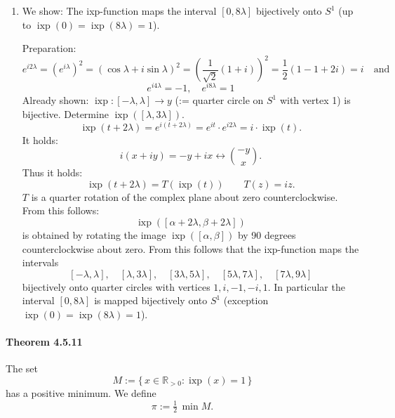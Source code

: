 \documentclass[12pt]{article}
\begin{document}
\begin{enumerate}[label=({\arabic*})]
		From ($**$) we get
		\[
			\sin\!\Bigl(\tfrac{1}{\sqrt{2}}\Bigr) < \tfrac{1}{\sqrt{2}},
			\qquad
			\sin\!\Bigl(\tfrac{4}{5}\Bigr) > \tfrac{4}{5}\Bigl(1 - \tfrac{16}{6\cdot 25}\Bigr)
				> \tfrac{4}{5}\Bigl(1 - \tfrac{16}{144}\Bigr) = \tfrac{32}{45}
				= \frac{\sqrt{1024}}{\sqrt{2025}} > \sqrt{\tfrac{1}{2}}.
		\]
		By monotonicity and continuity of $\sin$ on $I$ there exists a unique $\lambda\in(1/\sqrt{2},\,4/5)$ with $\sin \lambda = 1/\sqrt{2}$. Thus $\operatorname{ixp}([ -\lambda,\lambda])$ is precisely the quarter-arc of $S^{1}$ centered at $1$.
		From ($**$) we also get
		\[
			\cos\lambda = +\sqrt{1-\sin^{2}\!\lambda} = \sqrt{\tfrac{1}{2}},
		\]
		hence
		\[
			e^{\pm i\lambda} = \cos\lambda \pm i\sin\lambda = \tfrac{1}{\sqrt{2}}(1 \pm i).
		\]
		\item We show: The ixp-function maps the interval $[0, 8\lambda]$ bijectively onto $S^1$ (up to $\operatorname{ixp}(0) = \operatorname{ixp}(8\lambda) = 1$).

		Preparation:
		\[
			e^{i2\lambda} = (e^{i\lambda})^2 = (\cos \lambda + i \sin \lambda)^2 = \left(\frac{1}{\sqrt{2}}(1+i)\right)^2 = \frac{1}{2}(1 - 1 + 2i) = i \quad \text{and}
		\]
		\[
			e^{i4\lambda} = -1, \quad e^{i8\lambda} = 1
		\]
		Already shown: $\operatorname{ixp} : [-\lambda, \lambda] \to y$ (:= quarter circle on $S^1$ with vertex 1) is bijective.
		Determine $\operatorname{ixp}([\lambda, 3\lambda])$.
		\[
			\operatorname{ixp}(t + 2\lambda) = e^{i(t+2\lambda)} = e^{it} \cdot e^{i2\lambda} = i \cdot \operatorname{ixp}(t).
		\]
		It holds:
		\[
			i(x + iy) = -y + ix \leftrightarrow \binom{-y}{x}.
		\]
		Thus it holds:
		\[
			\operatorname{ixp}(t + 2\lambda) = T(\operatorname{ixp}(t)) \qquad T(z) = iz.
		\]
		$T$ is a quarter rotation of the complex plane about zero counterclockwise. From this follows:
		\[
			\operatorname{ixp}([\alpha + 2\lambda, \beta + 2\lambda])
		\]
		is obtained by rotating the image $\operatorname{ixp}([\alpha, \beta])$ by 90 degrees counterclockwise about zero. From this follows that the ixp-function maps the intervals
		\[
			[-\lambda, \lambda], \quad [\lambda, 3\lambda], \quad [3\lambda, 5\lambda], \quad [5\lambda, 7\lambda], \quad [7\lambda, 9\lambda]
		\]
		bijectively onto quarter circles with vertices $1, i, -1, -i, 1$. In particular the interval $[0, 8\lambda]$ is mapped bijectively onto $S^1$ (exception $\operatorname{ixp}(0) = \operatorname{ixp}(8\lambda) = 1$).
	\end{enumerate}

	\paragraph{Theorem 4.5.11} The set
	\[
		M := \{\, x \in \mathbb R_{>0} : \operatorname{ixp}(x) = 1 \,\}
	\]
	has a positive minimum. We define
	\[
		\pi := \tfrac{1}{2}\,\min M.
	\]
\end{document}
